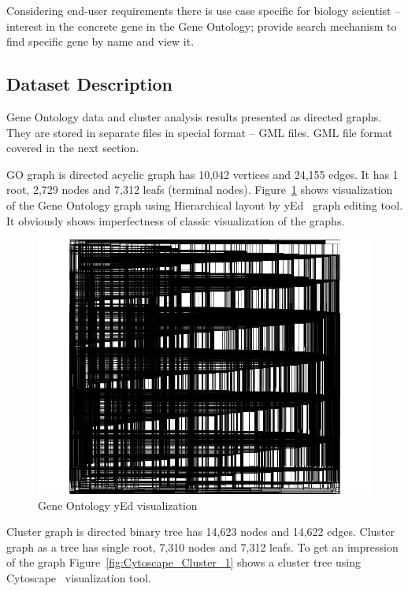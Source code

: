 Considering end-user requirements there is use case specific for biology scientist -- interest in the concrete gene in the Gene Ontology; provide search mechanism to find specific gene by name and view it.


\subsection{Dataset Description}
\label{sec:dataset_description}
Gene Ontology data and cluster analysis results presented as directed graphs. They are stored in separate files in special format -- GML files. GML file format covered in the next section.


GO graph is directed acyclic graph has 10,042 vertices and  24,155 edges. It has 1 root, 2,729 nodes and 7,312 leafs (terminal nodes). Figure~\ref{fig:yed_GO_vis} shows visualization of the Gene Ontology graph using Hierarchical layout by yEd~\cite{yed} graph editing tool. It obviously shows imperfectness of classic visualization of the graphs.


\begin{figure}[h!]
\centering
\includegraphics[scale=0.3]{pictures/yEd_GO.png}
\caption{Gene Ontology yEd visualization}
\label{fig:yed_GO_vis}
\end{figure}


Cluster graph is directed binary  tree has 14,623 nodes and 14,622 edges. Cluster graph as a tree has single root, 7,310 nodes and 7,312 leafs. To get an impression of the graph Figure~\ref{fig:Cytoscape_Cluster_1} shows a cluster tree using Cytoscape~\cite{Cytoscape} visualization tool.

